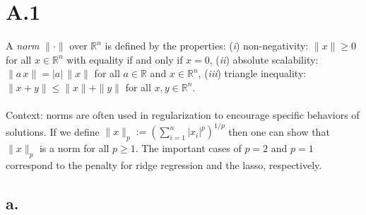 \documentclass{article}
\newcommand{\field}[1]{\mathbb{#1}}
\newcommand{\1}{\mathbf{1}}
\newcommand{\R}{\field{R}} %
\begin{document}
\section*{A.1}
{\Large

A \emph{norm} $\|\cdot\|$ over $\R^n$ is defined by the properties:
(\textit{i}) non-negativity: $\|x\|\geq 0$ for all $x \in \R^n$ with equality if and only if $x=0$,
(\textit{ii}) absolute scalability: $\|a \, x\| = |a| \, \|x\|$ for all $a \in \R$ and $x \in \R^n$, 
(\textit{iii}) triangle inequality: $\|x+y\| \leq \|x\| + \|y\|$ for all $x,y \in \R^n$. \\ \\

Context: norms are often used in regularization to encourage specific behaviors of solutions. If we define  $\| x \|_p := \left( \sum_{i=1}^n |x_i|^{p} \right)^{1/p}$ then one can show that $\| x \|_p$ is a norm for all $p \geq 1$. The important cases of $p=2$ and $p=1$ correspond to the penalty for ridge regression and the lasso, respectively.

\subsection*{a.}

}
\end{document}
